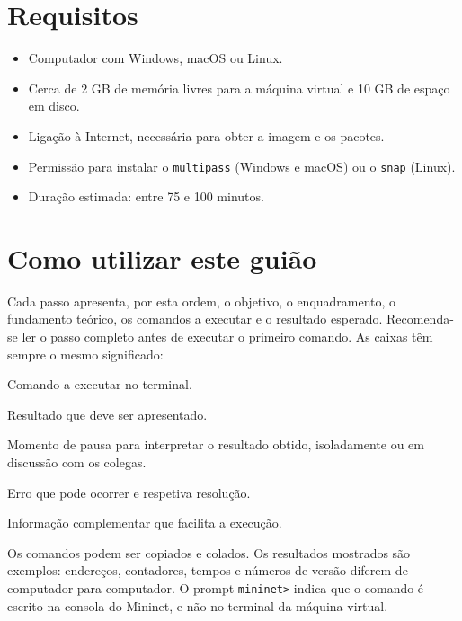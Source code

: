 \documentclass[11pt,a4paper]{article}
\newcommand{\cmd}[1]{\texttt{#1}}
\begin{document}
\section*{Requisitos}

\begin{itemize}
  \item Computador com Windows, macOS ou Linux.
  \item Cerca de 2 GB de memória livres para a máquina virtual e 10 GB de espaço em disco.
  \item Ligação à Internet, necessária para obter a imagem e os pacotes.
  \item Permissão para instalar o \cmd{multipass} (Windows e macOS) ou o \cmd{snap} (Linux).
  \item Duração estimada: entre 75 e 100 minutos.
\end{itemize}

\section*{Como utilizar este guião}

Cada passo apresenta, por esta ordem, o objetivo, o enquadramento, o fundamento teórico, os comandos a executar e o resultado esperado. Recomenda-se ler o passo completo antes de executar o primeiro comando. As caixas têm sempre o mesmo significado:

\begin{terminal}
Comando a executar no terminal.
\end{terminal}

\begin{saida}
Resultado que deve ser apresentado.
\end{saida}

\begin{observe}
Momento de pausa para interpretar o resultado obtido, isoladamente ou em discussão com os colegas.
\end{observe}

\begin{erro}
Erro que pode ocorrer e respetiva resolução.
\end{erro}

\begin{nota}
Informação complementar que facilita a execução.
\end{nota}

Os comandos podem ser copiados e colados. Os resultados mostrados são exemplos: endereços, contadores, tempos e números de versão diferem de computador para computador. O prompt \cmd{mininet>} indica que o comando é escrito na consola do Mininet, e não no terminal da máquina virtual.
\end{document}
